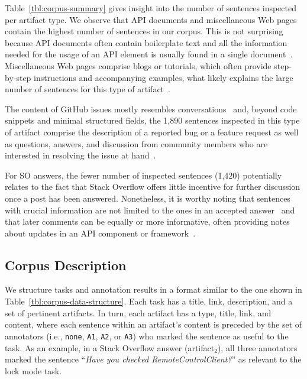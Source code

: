 Table~\ref{tbl:corpus-summary} gives insight into the number of sentences inspected per artifact type. 
We observe that API documents and miscellaneous Web pages contain the highest number of sentences in our corpus.
This is not surprising because API documents often contain boilerplate text 
and all the information needed for the usage of an API element is usually found in a single document~\cite{robillard2011field}.
Miscellaneous Web pages comprise blogs or tutorials, 
which often provide step-by-step instructions and accompanying examples, 
what likely explains the large number of sentences for this type of artifact~\cite{arya2020, Jiang2016b}.


The content of GitHub issues mostly resembles conversations~\cite{Rastkar2010}
and, beyond code snippets and minimal structured fields, the 
1,890 sentences inspected in this type of artifact comprise the description of a reported bug or a feature request as well as questions, answers, and discussion from  community members who are interested in resolving the issue at hand~\cite{zimmermann2010}.



For SO answers, the fewer number of inspected sentences (1,420) potentially relates to 
the fact that Stack Overflow offers little incentive for further discussion once a post has been answered.
Nonetheless, it is worthy noting that sentences with crucial information 
are not limited to the ones in an accepted answer~\cite{nadi2020}
and that later comments can be equally or more informative,
often providing notes about updates in an API component or framework~\cite{zhang2019so}.









\subsection{Corpus Description}



We structure tasks and annotation results in a format similar to the one shown in 
Table~\ref{tbl:corpus-data-structure}. 
Each task has a  title, link, description, and a set of pertinent artifacts.
In turn, each artifact has a type, title, link, and content,
where each sentence within an artifact's content
is preceded by the set of 
annotators (i.e., \texttt{none}, \texttt{A1}, \texttt{A2}, or \texttt{A3}) who marked the sentence as useful to the task.
As an example, in a Stack Overflow answer (artifact$_2$), all three annotators 
marked the sentence ``\textit{Have you checked RemoteControlClient?}''
as relevant to the lock mode task.


